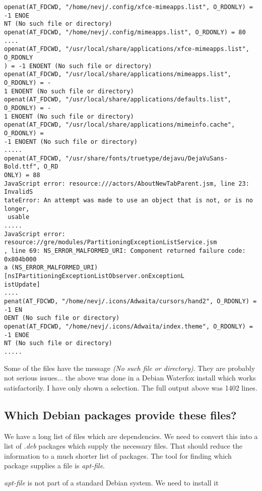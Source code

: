 \documentclass{article}  %
\begin{document}
\begin{verbatim}
openat(AT_FDCWD, "/home/nevj/.config/xfce-mimeapps.list", O_RDONLY) = -1 ENOE
NT (No such file or directory)
openat(AT_FDCWD, "/home/nevj/.config/mimeapps.list", O_RDONLY) = 80
....
openat(AT_FDCWD, "/usr/local/share/applications/xfce-mimeapps.list", O_RDONLY
) = -1 ENOENT (No such file or directory)
openat(AT_FDCWD, "/usr/local/share/applications/mimeapps.list", O_RDONLY) = -
1 ENOENT (No such file or directory)
openat(AT_FDCWD, "/usr/local/share/applications/defaults.list", O_RDONLY) = -
1 ENOENT (No such file or directory)
openat(AT_FDCWD, "/usr/local/share/applications/mimeinfo.cache", O_RDONLY) = 
-1 ENOENT (No such file or directory)
.....
openat(AT_FDCWD, "/usr/share/fonts/truetype/dejavu/DejaVuSans-Bold.ttf", O_RD
ONLY) = 88
JavaScript error: resource:///actors/AboutNewTabParent.jsm, line 23: InvalidS
tateError: An attempt was made to use an object that is not, or is no longer,
 usable
.....
JavaScript error: resource://gre/modules/PartitioningExceptionListService.jsm
, line 69: NS_ERROR_MALFORMED_URI: Component returned failure code: 0x804b000
a (NS_ERROR_MALFORMED_URI) [nsIPartitioningExceptionListObserver.onExceptionL
istUpdate]
....
penat(AT_FDCWD, "/home/nevj/.icons/Adwaita/cursors/hand2", O_RDONLY) = -1 EN
OENT (No such file or directory)
openat(AT_FDCWD, "/home/nevj/.icons/Adwaita/index.theme", O_RDONLY) = -1 ENOE
NT (No such file or directory)
.....
\end{verbatim}
 Some of the files have the message {\em (No such file or directory)}. They are probably not serious issues... the above was done in a Debian Waterfox install which works satisfactorily. I have only shown a selection. The full output above was 1402 lines. 


\subsection{Which Debian packages provide these files?}
We have a long list of files which are dependencies. We need to convert this into a list of {\em .deb} packages which supply the necessary files.  That should reduce the information to a much shorter list of packages. The tool for finding which package supplies a file is {\em apt-file}.

{\em apt-file} is not part of a standard Debian system. We need to install it
\end{document}
